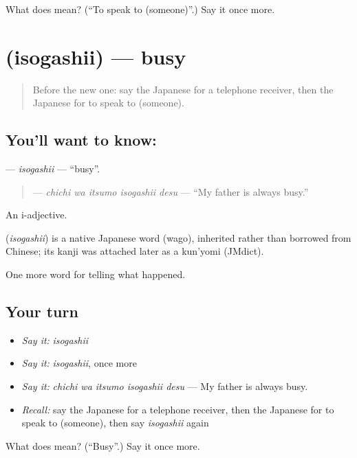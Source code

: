 \begin{tcolorbox}[breakable,colback=teal!4,colframe=teal!35!black,title={Before you move on}]
What does  mean? (\textquotedblleft{}To speak to (someone)\textquotedblright{}.) Say it once more.
\end{tcolorbox}
\section[\texorpdfstring{\ja{いそがしい} (isogashii)}{いそがしい (isogashii)}]{ (isogashii) — busy}

\label{lesson:JA-C308-isogashii}



\begin{quote}
Before the new one: say the Japanese for a telephone receiver, then the Japanese for to speak to (someone).
\end{quote}

\subsection*{You'll want to know: }
\textbf{} — \emph{isogashii} — \textquotedblleft{}busy\textquotedblright{}.

\begin{quote}
\textbf{  } — \emph{chichi wa itsumo isogashii desu} — \textquotedblleft{}My father is always busy.\textquotedblright{}
\end{quote}

An i-adjective.

\begin{cousinweb}
\textbf{} (\emph{isogashii}) is a native Japanese word (wago), inherited rather than borrowed from Chinese; its kanji was attached later as a kun'yomi (JMdict).
\end{cousinweb}

\begin{grammarlens}[title={What you've built}]
One more word for telling what happened.
\end{grammarlens}

\subsection*{Your turn}
\begin{itemize}
\raggedright
  \item \emph{Say it:} \emph{isogashii}
  \item \emph{Say it:} \emph{isogashii}, once more
  \item \emph{Say it:} \emph{chichi wa itsumo isogashii desu} — My father is always busy.
  \item \emph{Recall:} say the Japanese for a telephone receiver, then the Japanese for to speak to (someone), then say \emph{isogashii} again
\end{itemize}

\begin{tcolorbox}[breakable,colback=teal!4,colframe=teal!35!black,title={Before you move on}]
What does  mean? (\textquotedblleft{}Busy\textquotedblright{}.) Say it once more.
\end{tcolorbox}
